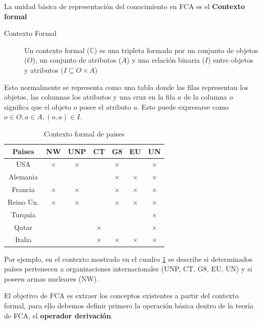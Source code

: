 	
	La unidad básica de representación del conocimiento en FCA es el \textbf{Contexto formal}
	
	\begin{description}
		\item[Contexto Formal] Un contexto formal ($ \mathbb{C} $) es una tripleta formada por un conjunto de objetos ($O$), un conjunto de atributos ($A$) y una relación binaria ($I$) entre objetos y atributos ($I \subseteq O \times A $)
	\end{description}

	Esto normalmente se representa como una tabla donde las filas representan los objetos, las columnas los atributos y una cruz en la fila $a$ de la columna $o$ significa que el objeto $o$ posee el atributo $a$. Esto puede expresarse como $o \in O, a \in A, (o, a)\in I$.
	
	\begin{table}
		\centering
		\begin{tabular}{|c||c|c|c|c|c|c|}
			\hline 
			Paises & NW & UNP & CT & G8 & EU & UN \\ 
			\hline 	
			\hline 
			USA & $\times$ & $\times$ &  & $\times$ &  & $\times$ \\ 
			\hline 
			Alemania &  &  &  & $\times$ & $\times$ & $\times$ \\ 
			\hline 
			Francia & $\times$ & $\times$ &  & $\times$ & $\times$ & $\times$ \\ 
			\hline 
			Reino Un. & $\times$ & $\times$ &  & $\times$ & $\times$ & $\times$ \\ 
			\hline 
			Turquía &  &  &  &  &  & $\times$ \\ 
			\hline 
			Qatar &  &  & $\times$ &  &  & $\times$ \\ 
			\hline 
			Italia &  &  & $\times$ & $\times$ & $\times$ & $\times$ \\ 
			\hline 
		\end{tabular} 
		\caption{Contexto formal de paises}
		\label{tabla_paises}
	\end{table}

	Por ejemplo, en el contexto mostrado en el cuadro \ref{tabla_paises} se describe si determinados países pertenecen a organizaciones internacionales (UNP, CT, G8, EU, UN) y si poseen armas nucleares (NW).
	
	El objetivo de FCA es extraer los conceptos existentes a partir del contexto formal, para ello debemos definir primero la operación básica dentro de la teoría de FCA, el \textbf{operador derivación}.
	
